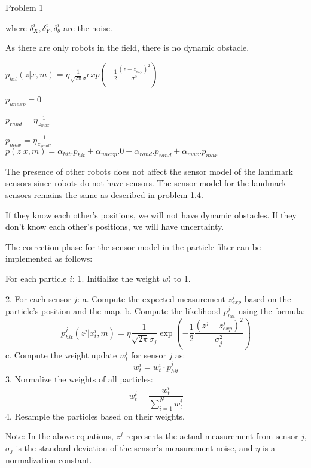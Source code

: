 \documentclass{article}
\begin{document}
\begin{problem}{Problem 1}
\begin{problem}{1.3}
where $\delta_X^i, \delta_Y^i, \delta_\theta^i$ are the noise.
\end{problem}

\begin{problem}{1.4}
As there are only robots in the field, there is no dynamic obstacle.

$p_{hit} (z|x,m) = \eta \frac{1}{\sqrt{2\pi}\sigma }exp(-\frac{1}{2} \frac{(z-z_{exp})^2}{\sigma^2})$

$p_{unexp} = 0$

$p_{rand} = \eta\frac{1}{z_{max}}$

$p_{max} = \eta \frac{1}{z_{small}}$\\

$p(z|x,m) = \alpha_{hit}.p_{hit} + \alpha_{unexp}.0 +\alpha_{rand}.p_{rand}+\alpha_{max} .p_{max}$

\end{problem}

\begin{problem}{1.5}
The presence of other robots does not affect the sensor model of the landmark sensors since robots do not have sensors. The sensor model for the landmark sensors remains the same as described in problem 1.4.
\end{problem}

\begin{problem}{1.6}
If they know each other's positions, we will not have dynamic obstacles. If they don't know each other's positions, we will have uncertainty.
\end{problem}

\begin{problem}{1.7}
The correction phase for the sensor model in the particle filter can be implemented as follows:

For each particle $i$:
1. Initialize the weight $w_t^i$ to 1.


2. For each sensor $j$:
a. Compute the expected measurement $z_{exp}^j$ based on the particle's position and the map.
b. Compute the likelihood $p_{hit}^j$ using the formula:
\[
    p_{hit}^j(z^j|x_t^i,m) = \eta \frac{1}{\sqrt{2\pi}\sigma_j} \exp\left(-\frac{1}{2} \frac{(z^j-z_{exp}^j)^2}{\sigma_j^2}\right)
\]
c. Compute the weight update $w_t^i$ for sensor $j$ as:
\[
    w_t^i = w_t^i \cdot p_{hit}^j
\]
3. Normalize the weights of all particles:
\[
    w_t^i = \frac{w_t^i}{\sum_{i=1}^{N} w_t^i}
\]
4. Resample the particles based on their weights.

Note: In the above equations, $z^j$ represents the actual measurement from sensor $j$, $\sigma_j$ is the standard deviation of the sensor's measurement noise, and $\eta$ is a normalization constant.


\end{problem}
\end{problem}
\end{document}
